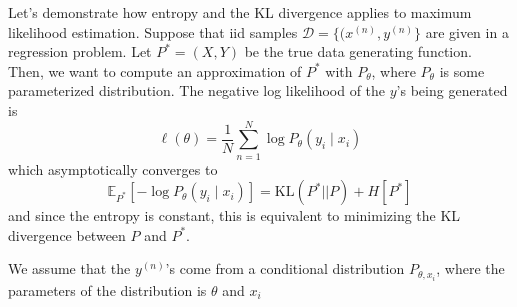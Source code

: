 \documentclass{article}
\begin{document}
    Let's demonstrate how entropy and the KL divergence applies to maximum likelihood estimation. Suppose that iid samples $\mathcal{D} = \{(x^{(n)}, y^{(n)}\}$ are given in a regression problem. Let $P^\ast = (X, Y)$ be the true data generating function. Then, we want to compute an approximation of $P^\ast$ with $P_\theta$, where $P_\theta$ is some parameterized distribution. The negative log likelihood of the $y$'s being generated is 
    \begin{equation}
      \ell(\theta) = \frac{1}{N} \sum_{n=1}^N \log P_\theta (y_i \mid x_i)
    \end{equation}
    which asymptotically converges to 
    \begin{equation}
      \mathbb{E}_{P^\ast} [ -\log P_\theta (y_i \mid x_i)] = \mathrm{KL}(P^\ast || P) + H[P^\ast]
    \end{equation}
    and since the entropy is constant, this is equivalent to minimizing the KL divergence between $P$ and $P^\ast$. 

    We assume that the $y^{(n)}$'s come from a conditional distribution $P_{\theta, x_i}$, where the parameters of the distribution is $\theta$ and $x_i$ 



\end{document}
